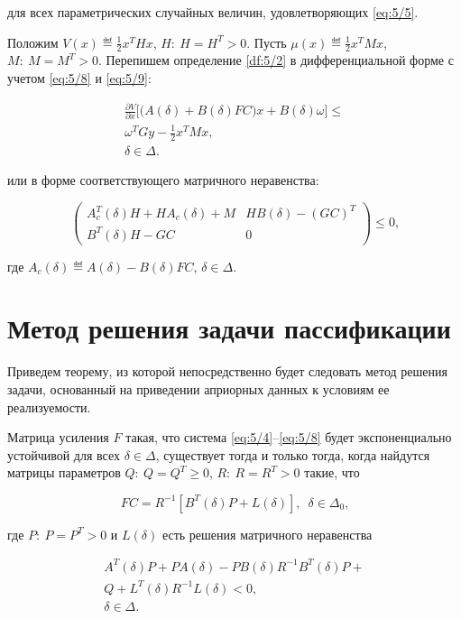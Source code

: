 для всех параметрических случайных величин, удовлетворяющих \ref{eq:5/5}.\br

Положим $V(x) \eqdef \frac{1}{2}x^THx$, $H\colon~H = H^T > 0$. Пусть $\mu(x) \eqdef \frac{1}{2}x^TMx$, $M\colon~M = M^T > 0$. Перепишем определение \vref{df:5/2} в дифференциальной форме с учетом \ref{eq:5/8} и \ref{eq:5/9}:

\begin{eqnarray}
\label{eq:5/10}
\frac{\partial V}{\partial x}\big[\big( A(\delta) + B(\delta)FC\big)x + B(\delta)\omega \big] \leqslant \nonumber \\
\omega^TGy - \frac{1}{2}x^TMx\mbox{,} \\
\delta \in \Delta{.} \nonumber
\end{eqnarray}

или в форме соответствующего матричного неравенства\cite{PF}:

\begin{equation}
\label{eq:5/11}
\left( \begin{array}{cc}
A_c^T(\delta)H + HA_c(\delta) + M    &    HB(\delta) - (GC)^T \\
B^T(\delta)H - GC                    &    0
\end{array} \right) \leqslant 0\mbox{,}
\end{equation}

где $A_c(\delta) \eqdef A(\delta) - B(\delta)FC$, $\delta \in \Delta$.





\section{Метод решения задачи пассификации}

Приведем теорему, из которой непосредственно будет следовать метод решения задачи, основанный на приведении априорных данных к условиям ее реализуемости.

\begin{teo}
\label{teo:5/1}
Матрица усиления $F$ такая, что система \ref{eq:5/4}--\vref{eq:5/8} будет экспоненциально устойчивой для всех $\delta \in \Delta$, существует тогда и только тогда, когда найдутся матрицы параметров $Q\colon~Q = Q^T \geqslant 0$, $R\colon~R=R^T>0$ такие, что

\begin{equation}
\label{eq:5/12}
FC = R^{-1}[B^T(\delta)P + L(\delta)]\mbox{,}~~~\delta \in \Delta_0\mbox{,}
\end{equation}

где $P\colon~P = P^T>0$ и $L(\delta)$ есть решения матричного неравенства

\begin{eqnarray}
\label{eq:5/13}
A^T(\delta)P + PA(\delta) - PB(\delta)R^{-1}B^T(\delta)P + \nonumber \\
Q + L^T(\delta)R^{-1}L(\delta) < 0\mbox{,} \\
\delta \in \Delta\mbox{.} \nonumber
\end{eqnarray}
\end{teo}


